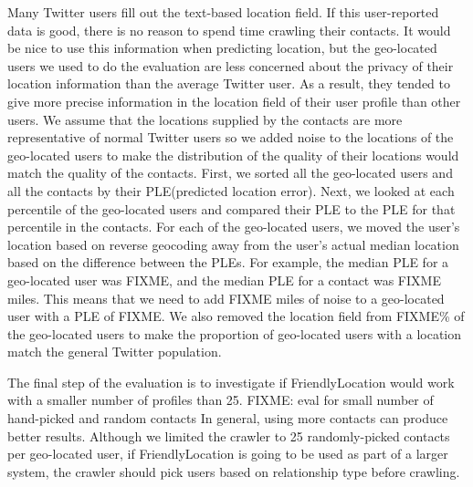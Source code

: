 Many Twitter users fill out the text-based location field.
%
If this user-reported data is good, there is no reason to spend time crawling
their contacts.
%
It would be nice to use this information when predicting location, but
the geo-located users we used to do the evaluation are less concerned about the
privacy of their location information than the average Twitter user.
%
As a result, they tended to give more precise information in the location field
of their user profile than other users.
%
We assume that the locations supplied by the contacts are more representative
of normal Twitter users so we added noise to the locations of the geo-located
users to make the distribution of the quality of their locations would match
the quality of the contacts.
%
First, we sorted all the geo-located users and all the contacts by their
PLE(predicted location error).
%
Next, we looked at each percentile of the geo-located users and compared their
PLE to the PLE for that percentile in the contacts.
%
For each of the geo-located users, we moved the user's location based on
reverse geocoding away from the user's actual median location based on the
difference between the PLEs.
%
For example, the median PLE for a geo-located user was FIXME, and the median
PLE for a contact was FIXME miles.
%
This means that we need to add FIXME miles of noise to a geo-located user with
a PLE of FIXME.
%
We also removed the location field from FIXME\% of the geo-located users to
make the proportion of geo-located users with a location match the general
Twitter population.

The final step of the evaluation is to investigate if FriendlyLocation would
work with a smaller number of profiles than 25.
%
FIXME: eval for small number of hand-picked and random contacts
%
In general, using more contacts can produce better results.
%
Although we limited the crawler to 25 randomly-picked contacts per geo-located
user, if FriendlyLocation is going to be used as part of a larger system, the
crawler should pick users based on relationship type before crawling.
